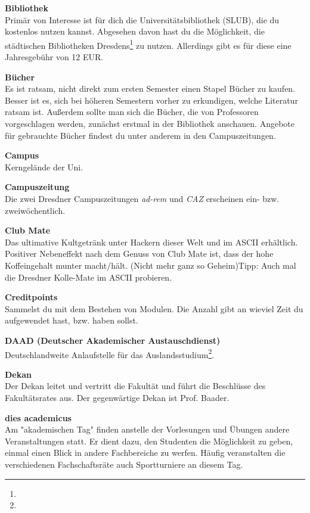 \textbf{Bibliothek} \\
Primär von Interesse ist für dich die Universitätsbibliothek (SLUB), die du kostenlos nutzen kannst.
Abgesehen davon hast du die Möglichkeit, die städtischen Bibliotheken Dresdens\footnote{} zu nutzen.
Allerdings gibt es für diese eine Jahresgebühr von 12 EUR.

\textbf{Bücher} \\
Es ist ratsam, nicht direkt zum ersten Semester einen Stapel Bücher zu kaufen.
Besser ist es, sich bei höheren Semestern vorher zu erkundigen, welche Literatur ratsam ist.
Außerdem sollte man sich die Bücher, die von Professoren vorgeschlagen werden, zunächst erstmal in der Bibliothek anschauen.
Angebote für gebrauchte Bücher findest du unter anderem in den Campuszeitungen.

\textbf{Campus} \\
Kerngelände der Uni.

\textbf{Campuszeitung} \\
Die zwei Dresdner Campuszeitungen \textit{ad-rem} und \textit{CAZ} erscheinen ein- bzw. zweiwöchentlich.

\textbf{Club Mate} \\
Das ultimative Kultgetränk unter Hackern dieser Welt und im ASCII erhältlich.
Positiver Nebeneffekt nach dem Genuss von Club Mate ist, dass der hohe Koffeingehalt munter macht/hält.
(Nicht mehr ganz so Geheim)Tipp:
Auch mal die Dresdner Kolle-Mate im ASCII probieren.

\textbf{Creditpoints} \\
Sammelst du mit dem Bestehen von Modulen.
Die Anzahl gibt an wieviel Zeit du aufgewendet hast, bzw. haben sollst.

\textbf{DAAD (Deutscher Akademischer Austauschdienst)} \\
Deutschlandweite Anlaufstelle für das Auslandsstudium\footnote{}.

\textbf{Dekan} \\
Der Dekan leitet und vertritt die Fakultät und führt die Beschlüsse des Fakultätsrates aus.
Der gegenwärtige Dekan ist Prof. Baader.

\textbf{dies academicus} \\
Am "akademischen Tag" finden anstelle der Vorlesungen und Übungen andere Veranstaltungen statt.
Er dient dazu, den Studenten die Möglichkeit zu geben, einmal einen Blick in andere Fachbereiche zu werfen.
Häufig veranstalten die verschiedenen Fachschaftsräte auch Sportturniere an diesem Tag.

